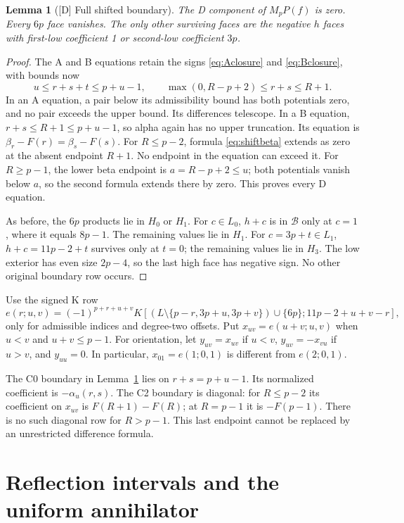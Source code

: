 \documentclass[11pt]{article}
\newtheorem{lemma}[theorem]{Lemma}
\theoremstyle{definition}
\theoremstyle{remark}
\begin{document}
\begin{lemma}[{[D]} Full shifted boundary]\label{lem:shift}
The D component of $M_pP(f)$ is zero. Every $6p$ face vanishes. The
only other surviving faces are the negative $h$ faces with first-low
coefficient 1 or second-low coefficient $3p$.
\end{lemma}
\begin{proof}
The A and B equations retain the signs \eqref{eq:Aclosure} and
\eqref{eq:Bclosure}, with bounds now
\[
 u\leq r+s+t\leq p+u-1,
 \qquad \max(0,R-p+2)\leq r+s\leq R+1.
\]
In an A equation, a pair below its admissibility bound has both potentials
zero, and no pair exceeds the upper bound. Its differences telescope.
In a B equation, $r+s\leq R+1\leq p+u-1$, so alpha again has no
upper truncation. Its equation is $\beta_r-F(r)=\beta_s-F(s)$.
For $R\leq p-2$, formula \eqref{eq:shiftbeta} extends as zero at
the absent endpoint $R+1$. No endpoint in the equation can exceed it.
For $R\geq p-1$, the lower beta endpoint is $a=R-p+2\leq u$;
both potentials vanish below $a$, so the second formula extends there
by zero. This proves every D equation.

As before, the $6p$ products lie in $H_0$ or $H_1$.
For $c\in L_0$, $h+c$ is in $\mathcal B$ only at $c=1$,
where it equals $8p-1$. The remaining values lie in $H_1$.
For $c=3p+t\in L_1$, $h+c=11p-2+t$ survives only at $t=0$;
the remaining values lie in $H_3$. The low exterior has even size
$2p-4$, so the last high face has negative sign. No other original
boundary row occurs.
\end{proof}

Use the signed K row
\begin{equation}\label{eq:erow}
 e(r;u,v)=(-1)^{p+r+u+v}
 K[(L\setminus\{p-r,3p+u,3p+v\})\cup\{6p\};11p-2+u+v-r],
\end{equation}
only for admissible indices and degree-two offsets. Put
$x_{uv}=e(u+v;u,v)$ when $u<v$ and $u+v\leq p-1$.
For orientation, let $y_{uv}=x_{uv}$ if $u<v$,
$y_{uv}=-x_{vu}$ if $u>v$, and $y_{uu}=0$.
In particular, $x_{01}=e(1;0,1)$ is different from $e(2;0,1)$.

The C0 boundary in Lemma~\ref{lem:shift} lies on
$r+s=p+u-1$. Its normalized coefficient is $-\alpha_u(r,s)$.
The C2 boundary is diagonal: for $R\leq p-2$ its coefficient on
$x_{uv}$ is $F(R+1)-F(R)$; at $R=p-1$ it is $-F(p-1)$.
There is no such diagonal row for $R>p-1$. This last endpoint cannot
be replaced by an unrestricted difference formula.

\section{Reflection intervals and the uniform annihilator}\label{sec:annihilator}
\end{document}
